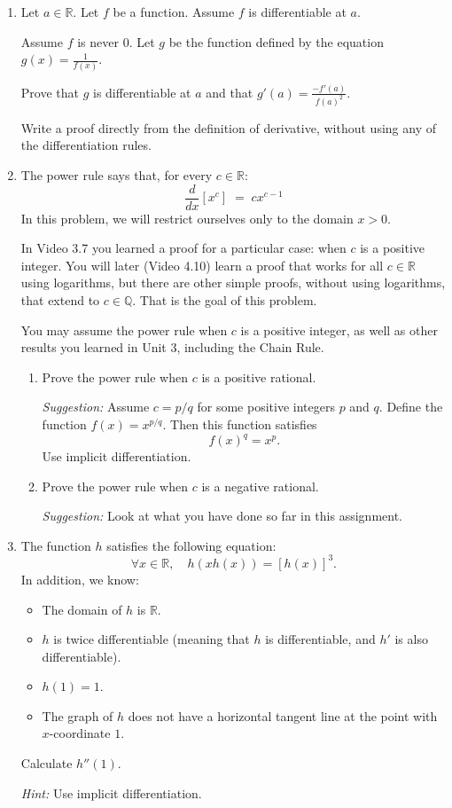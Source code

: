 \documentclass[12pt]{exam}
\newcommand {\DS} [1] {${\displaystyle #1}$}
\newcommand{\vv}{\vspace{.4cm}}
\newcommand{\R}{\mathbb{R}}
\newcommand{\Q}{\mathbb{Q}}
\begin{document}
\begin{enumerate}[resume]

\vv

\item  \label{qu:quotient} 
Let $a \in \R$.  Let $f$ be a function.  Assume $f$ is differentiable at $a$. 

Assume $f$ is never $0$.  Let $g$ be the function defined by the equation \DS{g(x) = \frac{1}{f(x)}}.

Prove that $g$ is differentiable at $a$ and that \DS{g'(a) =  \frac{-f'(a)}{f(a)^2}}. 

Write a proof directly from the definition of derivative, without using any of the differentiation rules.

\vv

\item \label{qu:power}  The power rule says that, for every $c \in \R$:
	$$
		\frac{d}{dx} \left[ x^c \right]  \; = \; c x^{c-1}
	$$
In this problem, we will restrict ourselves only to the domain $x>0$.

In Video 3.7 you learned a proof for a particular case: when $c$ is a positive integer.  You will later (Video 4.10) learn a proof that works for all $c \in \R$ using logarithms, but there are other simple proofs, without using logarithms, that extend to $c \in \Q$.  That is the goal of this problem.
	
You may assume the power rule when $c$ is a positive integer, as well as other results you learned in Unit 3, including the Chain Rule.
	\begin{enumerate}
		\item  Prove the power rule when $c$ is a positive rational.
		
		\emph{Suggestion:}  Assume $c=p/q$ for some positive integers $p$ and $q$.    Define the function $f(x)=x^{p/q}$.  Then this function satisfies
			$$
				f(x)^q = x^p.
			$$
			Use implicit differentiation.
		
		\item  Prove the power rule when $c$ is a negative rational.
		
		\emph{Suggestion:} Look at what you have done so far in this assignment.
	\end{enumerate}

\vv
\newpage

\item   The function $h$ satisfies the following equation:
	$$ \forall x \in \R, \quad h(xh(x)) = \left[ h(x)\right]^3. $$
In addition, we know:
	\begin{itemize}
		\item The domain of $h$ is $\R$.
		\item $h$ is twice differentiable (meaning that $h$ is differentiable, and $h'$ is also differentiable).
		\item $h(1)=1$.
		\item The graph of $h$ does not have a horizontal tangent line at the point with $x$-coordinate $1$.
	\end{itemize}
	
	Calculate \DS{h''(1)}.
	
	\emph{Hint:} Use implicit differentiation.


\end{enumerate}
\end{document}
